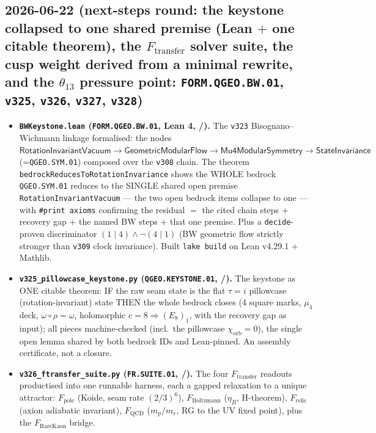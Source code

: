 \subsection*{2026-06-22 (next-steps round: the keystone collapsed to one shared premise (Lean $+$ one citable theorem), the $F_{\mathrm{transfer}}$ solver suite, the cusp weight derived from a minimal rewrite, and the $\theta_{13}$ pressure point: \texttt{FORM.QGEO.BW.01}, \texttt{v325}, \texttt{v326}, \texttt{v327}, \texttt{v328})}
\begin{itemize}
\item \textbf{\texttt{BWKeystone.lean} (\texttt{FORM.QGEO.BW.01}, Lean 4, \mE/\mO).} The \texttt{v323} Bisognano--Wichmann
  linkage formalised: the nodes $\textsf{RotationInvariantVacuum}\to\textsf{GeometricModularFlow}\to
  \textsf{Mu4ModularSymmetry}\to\textsf{StateInvariance}$ (=\texttt{QGEO.SYM.01}) composed over the \texttt{v308} chain.
  The theorem \texttt{bedrockReducesToRotationInvariance} shows the WHOLE bedrock \texttt{QGEO.SYM.01} reduces to
  the SINGLE shared open premise \texttt{RotationInvariantVacuum} --- the two open bedrock items collapse to one ---
  with \texttt{\#print axioms} confirming the residual $=$ the cited chain steps $+$ recovery gap $+$ the named BW
  steps $+$ that one premise.  Plus a \texttt{decide}-proven discriminator $(1\mid4)\wedge\neg(4\mid1)$ (BW geometric
  flow strictly stronger than \texttt{v309} clock invariance).  Built \texttt{lake build} on Lean v4.29.1 $+$ Mathlib.
\item \textbf{\texttt{v325\_pillowcase\_keystone.py} (\texttt{QGEO.KEYSTONE.01}, \mE/\mO).} The keystone as ONE
  citable theorem: IF the raw seam state is the flat $\tau{=}i$ pillowcase (rotation-invariant) state THEN the whole
  bedrock closes (4 square marks, $\mu_4$ deck, $\omega\circ\rho{=}\omega$, holomorphic $c{=}8\Rightarrow(E_8)_1$,
  with the recovery gap as input); all pieces machine-checked (incl.\ the pillowcase $\chi_{\mathrm{orb}}{=}0$), the
  single open lemma shared by both bedrock IDs and Lean-pinned.  An assembly certificate, not a closure.
\item \textbf{\texttt{v326\_ftransfer\_suite.py} (\texttt{FR.SUITE.01}, \mE/\mC).} The four $F_{\mathrm{transfer}}$
  readouts productised into one runnable harness, each a gapped relaxation to a unique attractor: $F_{\mathrm{pole}}$
  (Koide, seam rate $(2/3)^6$), $F_{\mathrm{Boltzmann}}$ ($\eta_B$, H-theorem), $F_{\mathrm{relic}}$ (axion adiabatic
  invariant), $F_{\mathrm{QCD}}$ ($m_p/m_e$, RG to the UV fixed point), plus the $F_{\mathrm{RareKaon}}$ bridge.

\end{itemize}
